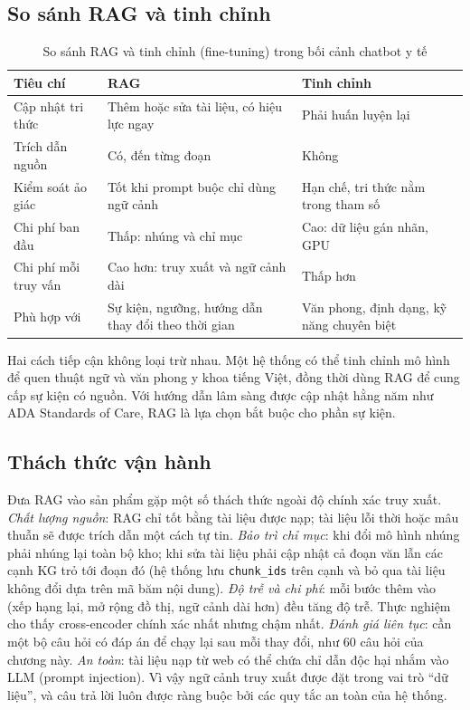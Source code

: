 \subsection{So sánh RAG và tinh chỉnh}

\begin{table}[H]
\centering
\caption{So sánh RAG và tinh chỉnh (fine-tuning) trong bối cảnh chatbot y tế}
\label{tab:rag-ft}
\small
\begin{tabularx}{\linewidth}{@{}L{3.2cm}YY@{}}
\toprule
\textbf{Tiêu chí} & \textbf{RAG} & \textbf{Tinh chỉnh} \\
\midrule
Cập nhật tri thức & Thêm hoặc sửa tài liệu, có hiệu lực ngay & Phải huấn luyện lại \\
Trích dẫn nguồn & Có, đến từng đoạn & Không \\
Kiểm soát ảo giác & Tốt khi prompt buộc chỉ dùng ngữ cảnh & Hạn chế, tri thức nằm trong tham số \\
Chi phí ban đầu & Thấp: nhúng và chỉ mục & Cao: dữ liệu gán nhãn, GPU \\
Chi phí mỗi truy vấn & Cao hơn: truy xuất và ngữ cảnh dài & Thấp hơn \\
Phù hợp với & Sự kiện, ngưỡng, hướng dẫn thay đổi theo thời gian & Văn phong, định dạng, kỹ năng chuyên biệt \\
\bottomrule
\end{tabularx}
\end{table}

Hai cách tiếp cận không loại trừ nhau. Một hệ thống có thể tinh chỉnh mô hình để quen thuật ngữ và văn phong y khoa tiếng Việt, đồng thời dùng RAG để cung cấp sự kiện có nguồn. Với hướng dẫn lâm sàng được cập nhật hằng năm như ADA Standards of Care, RAG là lựa chọn bắt buộc cho phần sự kiện.

\subsection{Thách thức vận hành}

Đưa RAG vào sản phẩm gặp một số thách thức ngoài độ chính xác truy xuất. \emph{Chất lượng nguồn}: RAG chỉ tốt bằng tài liệu được nạp; tài liệu lỗi thời hoặc mâu thuẫn sẽ được trích dẫn một cách tự tin. \emph{Bảo trì chỉ mục}: khi đổi mô hình nhúng phải nhúng lại toàn bộ kho; khi sửa tài liệu phải cập nhật cả đoạn văn lẫn các cạnh KG trỏ tới đoạn đó (hệ thống lưu \texttt{chunk\_ids} trên cạnh và bỏ qua tài liệu không đổi dựa trên mã băm nội dung). \emph{Độ trễ và chi phí}: mỗi bước thêm vào (xếp hạng lại, mở rộng đồ thị, ngữ cảnh dài hơn) đều tăng độ trễ. Thực nghiệm cho thấy cross-encoder chính xác nhất nhưng chậm nhất. \emph{Đánh giá liên tục}: cần một bộ câu hỏi có đáp án để chạy lại sau mỗi thay đổi, như 60 câu hỏi của chương này. \emph{An toàn}: tài liệu nạp từ web có thể chứa chỉ dẫn độc hại nhắm vào LLM (prompt injection). Vì vậy ngữ cảnh truy xuất được đặt trong vai trò ``dữ liệu'', và câu trả lời luôn được ràng buộc bởi các quy tắc an toàn của hệ thống.

